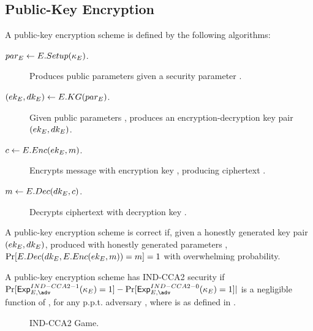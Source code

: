 \subsection{Public-Key Encryption}
\label{sapp:pk-encryption}

A public-key encryption scheme is defined by the following algorithms:

\begin{description}
\item[$par_{E} \gets E.Setup(\kappa_{E})$.] Produces public parameters \Eparm given
  a security parameter \Esecpar.
\item[$(ek_{E},dk_{E}) \gets E.KG(par_{E})$.] Given public parameters \Eparm,
  produces an encryption-decryption key pair $(ek_{E},dk_{E})$.
\item[$c \gets E.Enc(ek_{E},m)$.] Encrypts message \msg with encryption key
  \Eek, producing ciphertext \Ec.
\item[$m \gets E.Dec(dk_{E},c)$.] Decrypts ciphertext \Ec with decryption key
  \Edk.
\end{description}

A public-key encryption scheme is correct if, given a honestly generated key
pair $(ek_{E},dk_{E})$, produced with honestly generated parameters \Eparm,
$\Pr[E.Dec(dk_{E},E.Enc(ek_{E},m))=m] = 1$ with overwhelming probability.

A public-key encryption scheme has IND-CCA2 security if
$\Pr[\ExpINDCCAiio(\Esecpar) = 1] - \Pr[\ExpINDCCAiiz(\Esecpar) = 1]|$ is
a negligible function of \Esecpar, for any p.p.t. adversary \adv, where
\ExpINDCCAiib is as defined in .

\begin{figure}[ht!]
  \label{fig:indcca2-game}
  \caption{IND-CCA2 Game.}
\end{figure}

